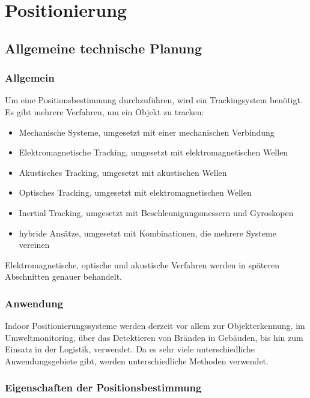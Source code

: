 \chapter{Positionierung}
\renewcommand{\kapitelautor}{Autor: Christina Bornberg}

\section{Allgemeine technische Planung}

    \subsection{Allgemein}
    Um eine Positionsbestimmung durchzuführen, wird ein Trackingsystem benötigt.
    Es gibt mehrere Verfahren, um ein Objekt zu tracken: \cite{PositionAllg}
    \begin{itemize}
    \item Mechanische Systeme, umgesetzt mit einer mechanischen Verbindung
    \item Elektromagnetische Tracking, umgesetzt mit elektromagnetischen Wellen
    \item Akustisches Tracking, umgesetzt mit akustischen Wellen
    \item Optisches Tracking, umgesetzt mit elektromagnetischen Wellen
    \item Inertial Tracking, umgesetzt mit Beschleunigungsmessern und Gyroskopen
    \item hybride Ansätze, umgesetzt mit Kombinationen, die mehrere Systeme vereinen
    \end{itemize}
    Elektromagnetische, optische und akustische Verfahren werden in späteren Abschnitten genauer behandelt.

    \subsection{Anwendung}
    Indoor Positionierungssysteme werden derzeit vor allem zur Objekterkennung, im Umweltmonitoring, über das Detektieren von Bränden in Gebäuden, bis hin zum Einsatz in der Logistik, verwendet. Da es sehr viele unterschiedliche Anwendungsgebiete gibt, werden unterschiedliche Methoden verwendet. \cite{posAnwendung}

    \subsection{Eigenschaften der Positionsbestimmung}

